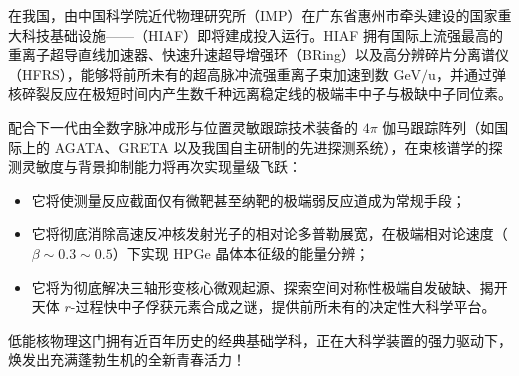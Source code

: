 在我国，由中国科学院近代物理研究所（IMP）在广东省惠州市牵头建设的国家重大科技基础设施——（HIAF）即将建成投入运行。HIAF 拥有国际上流强最高的重离子超导直线加速器、快速升速超导增强环（BRing）以及高分辨碎片分离谱仪（HFRS），能够将前所未有的超高脉冲流强重离子束加速到数 $\text{GeV/u}$，并通过弹核碎裂反应在极短时间内产生数千种远离稳定线的极端丰中子与极缺中子同位素。

配合下一代由全数字脉冲成形与位置灵敏跟踪技术装备的 $4\pi$ 伽马跟踪阵列（如国际上的 AGATA、GRETA 以及我国自主研制的先进探测系统），在束核谱学的探测灵敏度与背景抑制能力将再次实现量级飞跃：
\begin{itemize}
    \item 它将使测量反应截面仅有微靶甚至纳靶的极端弱反应道成为常规手段；
    \item 它将彻底消除高速反冲核发射光子的相对论多普勒展宽，在极端相对论速度（$\beta \sim 0.3 \sim 0.5$）下实现 HPGe 晶体本征级的能量分辨；
    \item 它将为彻底解决三轴形变核心微观起源、探索空间对称性极端自发破缺、揭开天体 $r$-过程快中子俘获元素合成之谜，提供前所未有的决定性大科学平台。
\end{itemize}

低能核物理这门拥有近百年历史的经典基础学科，正在大科学装置的强力驱动下，焕发出充满蓬勃生机的全新青春活力！
